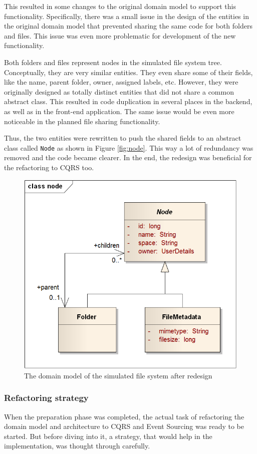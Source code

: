 \documentclass{book}
\begin{document}
This resulted in some changes to the original domain model to support
this functionality. Specifically, there was a small issue in the design
of the entities in the original domain model that prevented sharing the
same code for both folders and files. This issue was even more
problematic for development of the new functionality.

Both folders and files represent nodes in the simulated file system
tree. Conceptually, they are very similar entities. They even share some
of their fields, like the name, parent folder, owner, assigned labels,
etc. However, they were originally designed as totally distinct entities
that did not share a common abstract class. This resulted in code
duplication in several places in the backend, as well as in the
front-end application. The same issue would be even more noticeable in
the planned file sharing functionality.

Thus, the two entities were rewritten to push the shared fields to an
abstract class called \texttt{Node} as shown in Figure \ref{fig:node}.
This way a lot of redundancy was removed and the code became clearer. In
the end, the redesign was beneficial for the refactoring to CQRS too.


\begin{figure}[h!]
\begin{center}
\includegraphics[width=0.49\columnwidth]{figures/node/node}
\caption{The domain model of the simulated file system after redesign%
}
\end{center}
\end{figure}

\subsubsection{Refactoring strategy}\label{refactoring-strategy}

When the preparation phase was completed, the actual task of refactoring
the domain model and architecture to CQRS and Event Sourcing was ready
to be started. But before diving into it, a strategy, that would help in
the implementation, was thought through carefully.
\end{document}
